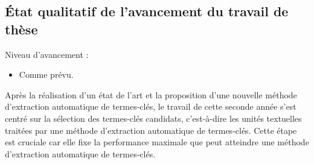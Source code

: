     \subsection{État qualitatif de l'avancement du travail de thèse}
      Niveau d'avancement :
      \begin{itemize}
        \item{Comme prévu.}
      \end{itemize}

      Après la réalisation d'un état de l'art et la proposition d'une nouvelle
      méthode d'extraction automatique de termes-clés, le travail de cette
      seconde année s'est centré sur la sélection des termes-clés candidats,
      c'est-à-dire les unités textuelles traitées par une méthode d'extraction
      automatique de termes-clés. Cette étape est cruciale car elle fixe la
      performance maximale que peut atteindre une méthode d'extraction
      automatique de termes-clés.

